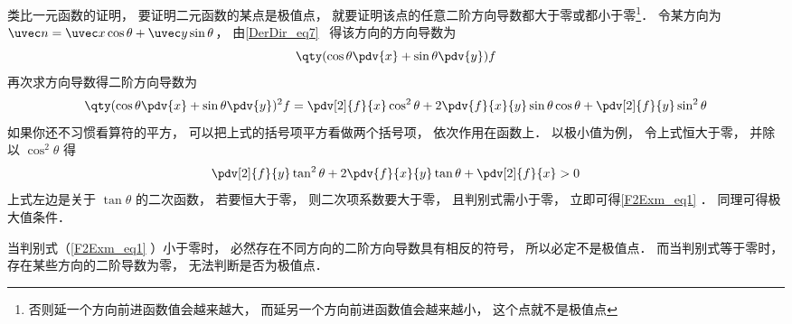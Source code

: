 类比一元函数的证明， 要证明二元函数的某点是极值点， 就要证明该点的任意二阶方向导数都大于零或都小于零\footnote{否则延一个方向前进函数值会越来越大， 而延另一个方向前进函数值会越来越小， 这个点就不是极值点}． 令某方向为 $\uvec n = \uvec x \cos\theta + \uvec y \sin\theta$， 由\autoref{DerDir_eq7}~ 得该方向的方向导数为
\begin{equation}
\qty(\cos\theta\pdv{x} + \sin\theta\pdv{y}) f
\end{equation}
再次求方向导数得二阶方向导数为
\begin{equation}
\qty(\cos\theta\pdv{x} + \sin\theta\pdv{y})^2 f
= \pdv[2]{f}{x} \cos^2\theta + 2\pdv{f}{x}{y} \sin\theta\cos\theta + \pdv[2]{f}{y} \sin^2\theta
\end{equation}
如果你还不习惯看算符的平方， 可以把上式的括号项平方看做两个括号项， 依次作用在函数上． 以极小值为例， 令上式恒大于零， 并除以 $\cos^2\theta$ 得
\begin{equation}
\pdv[2]{f}{y} \tan^2\theta + 2\pdv{f}{x}{y} \tan\theta + \pdv[2]{f}{x} > 0
\end{equation}
上式左边是关于 $\tan\theta$ 的二次函数， 若要恒大于零， 则二次项系数要大于零， 且判别式需小于零， 立即可得\autoref{F2Exm_eq1} ． 同理可得极大值条件．

当判别式（\autoref{F2Exm_eq1} ）小于零时， 必然存在不同方向的二阶方向导数具有相反的符号， 所以必定不是极值点． 而当判别式等于零时， 存在某些方向的二阶导数为零， 无法判断是否为极值点．
